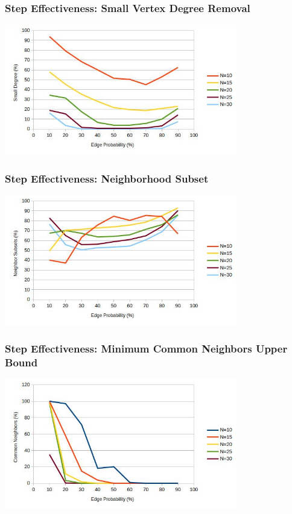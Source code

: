 \documentclass{beamer}
\begin{document}
\begin{frame}
  \frametitle{Step Effectiveness: Small Vertex Degree Removal}
  \begin{center}
    \includegraphics[width=4in]{../final/qz_small}
  \end{center}
\end{frame}

\begin{frame}
  \frametitle{Step Effectiveness: Neighborhood Subset}
  \begin{center}
    \includegraphics[width=4in]{../final/qz_subset}
  \end{center}
\end{frame}

\begin{frame}
  \frametitle{Step Effectiveness: Minimum Common Neighbors Upper Bound}
  \begin{center}
    \includegraphics[width=4in]{../final/qz_common}
  \end{center}
\end{frame}
\end{document}
